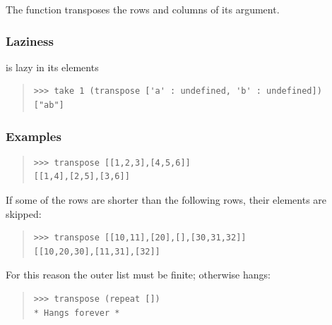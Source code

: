 \begin{haddockdesc}
\item[\begin{tabular}{@{}l}
transpose :: {\char 91}{\char 91}a{\char 93}{\char 93} -> {\char 91}{\char 91}a{\char 93}{\char 93}
\end{tabular}]
{\haddockbegindoc
The  function transposes the rows and columns of its argument.\par
\subsubsection*{\textbf{Laziness}}
 is lazy in its elements\par
\begin{quote}
{\haddockverb\begin{verbatim}
>>> take 1 (transpose ['a' : undefined, 'b' : undefined])
["ab"]

\end{verbatim}}
\end{quote}
\subsubsection*{\textbf{Examples}}
\begin{quote}
{\haddockverb\begin{verbatim}
>>> transpose [[1,2,3],[4,5,6]]
[[1,4],[2,5],[3,6]]

\end{verbatim}}
\end{quote}
If some of the rows are shorter than the following rows, their elements are skipped:\par
\begin{quote}
{\haddockverb\begin{verbatim}
>>> transpose [[10,11],[20],[],[30,31,32]]
[[10,20,30],[11,31],[32]]

\end{verbatim}}
\end{quote}
For this reason the outer list must be finite; otherwise  hangs:\par
\begin{quote}
{\haddockverb\begin{verbatim}
>>> transpose (repeat [])
* Hangs forever *

\end{verbatim}}
\end{quote}}
\end{haddockdesc}
